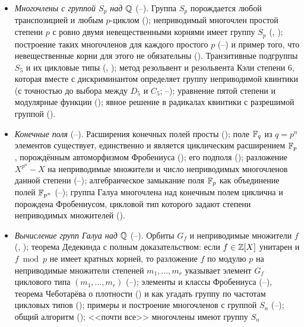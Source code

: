 \begin{itemize}[leftmargin=*]
способ различить $D_4$ и $C_4$~--- критерий Каппе--Уоррена (--). Решение уравнения четвёртой степени:
методы Феррари и Декарта, критерий разложимости на квадратичные множители, формула Эйлера, пучок коник, число вещественных
корней (--); примеры (--) и задача о скрещённых лестницах (--).
\item \emph{Многочлены с группой $S_p$ над $\mathbb Q$} (--). Группа $S_p$ порождается любой транспозицией и
любым $p$-циклом (); неприводимый многочлен простой степени $p$ с ровно двумя невещественными корнями имеет
группу $S_p$ (, ); построение таких многочленов для каждого простого $p$ (--) и пример
того, что невещественные корни для этого не обязательны (). Транзитивные подгруппы $S_5$ и их цикловые типы
(, ); метод резольвент и резольвента Кэли степени $6$, которая вместе с дискриминантом определяет
группу неприводимой квинтики (с точностью до выбора между $D_5$ и $C_5$; --); уравнение пятой
степени и модулярные функции (); явное решение в радикалах квинтики с разрешимой группой ().
\item \emph{Конечные поля} (--). Расширения конечных полей просты (); поле $\mathbb F_q$ из $q=p^n$
элементов существует, единственно и является циклическим расширением $\mathbb F_p$, порождённым автоморфизмом Фробениуса
(); его подполя (); разложение $X^{p^n}-X$ на неприводимые множители и число неприводимых многочленов
данной степени (--); алгебраическое замыкание поля $\mathbb F_p$ как объединение полей $\mathbb F_{p^n}$
(--); группа Галуа многочлена над конечным полем циклична и порождена Фробениусом, цикловой тип которого
задают степени неприводимых множителей ().
\item \emph{Вычисление групп Галуа над $\mathbb Q$} (--). Орбиты $G_f$ и неприводимые множители $f$ (,
); теорема Дедекинда с полным доказательством: если $f\in\mathbb Z[X]$ унитарен и $f\bmod p$ не имеет кратных корней,
то разложение $f$ по модулю $p$ на неприводимые множители степеней $m_1,\dots,m_r$ указывает элемент $G_f$ циклового типа
$(m_1,\dots,m_r)$ (--); элементы и классы Фробениуса (--), теорема Чеботарёва о
плотности () и как угадать группу по частотам цикловых типов (); примеры и построение многочленов с
группой $S_n$ (--); общий алгоритм (); <<почти все>> многочлены имеют группу $S_n$

\end{itemize}

